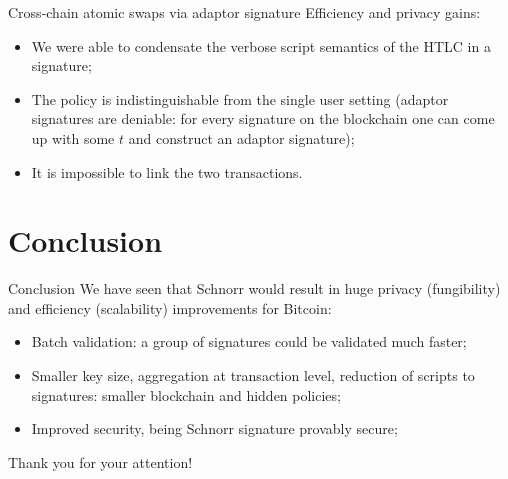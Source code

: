 \documentclass[slidescentered]{beamer}
\begin{document}
	\begin{frame}{Cross-chain atomic swaps via adaptor signature}
		Efficiency and privacy gains:
		\begin{itemize}
			\item We were able to condensate the verbose script semantics of the HTLC in a signature;
			\item The policy is indistinguishable from the single user setting (adaptor signatures are deniable: for every signature on the blockchain one can come up with some $t$ and construct an adaptor signature);
			\item It is impossible to link the two transactions.
		\end{itemize}
	\end{frame}

	\section{Conclusion}
	\begin{frame}{Conclusion}
		We have seen that Schnorr would result in huge privacy (fungibility) and efficiency (scalability) improvements for Bitcoin:
		\begin{itemize}
			\item  Batch validation: a group of signatures could be validated much faster;
			\item Smaller key size, aggregation at transaction level, reduction of scripts to signatures: smaller blockchain and hidden policies;
			\item Improved security, being Schnorr signature provably secure;
		\end{itemize}
	
	\end{frame}

	\begin{frame}
		\centering
		\huge Thank you for your attention!
		\par
	\end{frame}
	
\end{document}
